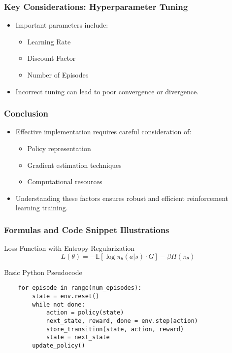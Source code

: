 \documentclass[aspectratio=169]{beamer}
\begin{document}
\begin{frame}
    \frametitle{Key Considerations: Hyperparameter Tuning}
    \begin{itemize}
        \item Important parameters include:
        \begin{itemize}
            \item Learning Rate
            \item Discount Factor
            \item Number of Episodes
        \end{itemize}
        \item Incorrect tuning can lead to poor convergence or divergence.
    \end{itemize}
\end{frame}

\begin{frame}
    \frametitle{Conclusion}
    \begin{itemize}
        \item Effective implementation requires careful consideration of:
        \begin{itemize}
            \item Policy representation
            \item Gradient estimation techniques
            \item Computational resources
        \end{itemize}
        \item Understanding these factors ensures robust and efficient reinforcement learning training.
    \end{itemize}
\end{frame}

\begin{frame}[fragile]
    \frametitle{Formulas and Code Snippet Illustrations}
    \begin{block}{Loss Function with Entropy Regularization}
    \begin{equation}
    L(\theta) = -\mathbb{E} [\log \pi_\theta(a|s) \cdot G] - \beta H(\pi_\theta)
    \end{equation}
    \end{block}
    \begin{block}{Basic Python Pseudocode}
    \begin{lstlisting}
    for episode in range(num_episodes):
        state = env.reset()
        while not done:
            action = policy(state)
            next_state, reward, done = env.step(action)
            store_transition(state, action, reward)
            state = next_state
        update_policy()
    \end{lstlisting}
    \end{block}
\end{frame}
\end{document}
